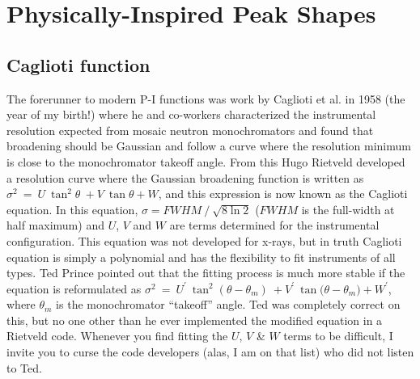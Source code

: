  

\section{Physically-Inspired Peak Shapes}

\subsection{Caglioti function}
\label{sec:sigma2}

The forerunner to modern P-I functions was work by Caglioti et al. in 1958 (the year of my birth!) where he and co-workers characterized the instrumental resolution expected from mosaic neutron monochromators and found that broadening should be Gaussian and follow a curve where the resolution minimum is close to the monochromator takeoff angle. From this Hugo Rietveld developed a resolution curve where the Gaussian broadening function is written as $\sigma^2\ =\ U\ \tan^2{\theta}\ +V\ \tan{\theta}+W$, and this expression is now known as the Caglioti equation. In this equation, $\sigma=FWHM\ /\ \sqrt{8\ln{2}}$ ($FWHM$ is the full-width at half maximum) and $U$, $V$ and $W$ are terms determined for the instrumental configuration. This equation was not developed for x-rays, but in truth Caglioti equation is simply a polynomial and has the flexibility to fit instruments of all types. Ted Prince pointed out that the fitting process is much more stable if the equation is reformulated as $\sigma^2\ =\ U^\prime\ \tan^2{\left(\theta-\theta_m\right)}\ +V^\prime\ \tan{(\theta}-\theta_m)+W^\prime$, where $\theta_m $ is the monochromator “takeoff” angle. Ted was completely correct on this, but no one other than he ever implemented the modified equation in a Rietveld code. Whenever you find fitting the $U$, $V$ \& $W$ terms to be difficult, I invite you to curse the code developers (alas, I am on that list) who did not listen to Ted. 


